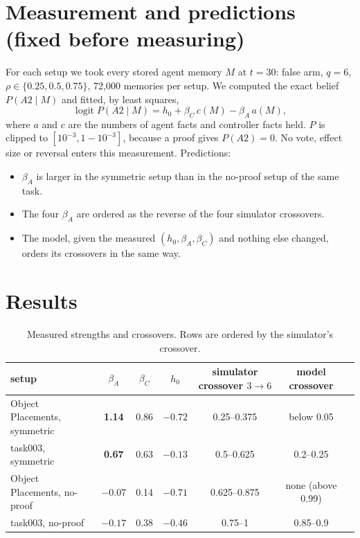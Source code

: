 \documentclass[10pt,a4paper]{article}
\begin{document}
\section{Measurement and predictions (fixed before measuring)}
For each setup we took every stored agent memory $M$ at $t=30$: false arm, $q=6$, $\rho\in\{0.25,0.5,0.75\}$, 72{,}000
memories per setup. We computed the exact belief $P(A2\mid M)$ and fitted, by least squares,
\begin{equation}
\operatorname{logit}P(A2\mid M)=h_0+\beta_C\,c(M)-\beta_A\,a(M),\label{eq:fit}
\end{equation}
where $a$ and $c$ are the numbers of agent facts and controller facts held. $P$ is clipped to $[10^{-3},1-10^{-3}]$,
because a proof gives $P(A2)=0$. No vote, effect size or reversal enters this measurement. Predictions:
\begin{itemize}
\item[B1] $\beta_A$ is larger in the symmetric setup than in the no-proof setup of the same task.
\item[B2] The four $\beta_A$ are ordered as the reverse of the four simulator crossovers.
\item[B3] The model, given the measured $(h_0,\beta_A,\beta_C)$ and nothing else changed, orders its crossovers in the
  same way.
\end{itemize}

\section{Results}
\begin{table}[h]
\centering\small
\begin{tabular}{@{}lcccccc@{}}
\toprule
setup & $\beta_A$ & $\beta_C$ & $h_0$ & simulator crossover $3\to6$ & model crossover\\
\midrule
Object Placements, symmetric & \textbf{1.14} & 0.86 & $-0.72$ & 0.25--0.375 & below 0.05\\
task003, symmetric & \textbf{0.67} & 0.63 & $-0.13$ & 0.5--0.625 & 0.2--0.25\\
Object Placements, no-proof & \textbf{$-0.07$} & 0.14 & $-0.71$ & 0.625--0.875 & none (above 0.99)\\
task003, no-proof & \textbf{$-0.17$} & 0.38 & $-0.46$ & 0.75--1 & 0.85--0.9\\
\bottomrule
\end{tabular}
\caption{Measured strengths and crossovers. Rows are ordered by the simulator's crossover.}
\label{tab:res}
\end{table}
\end{document}
